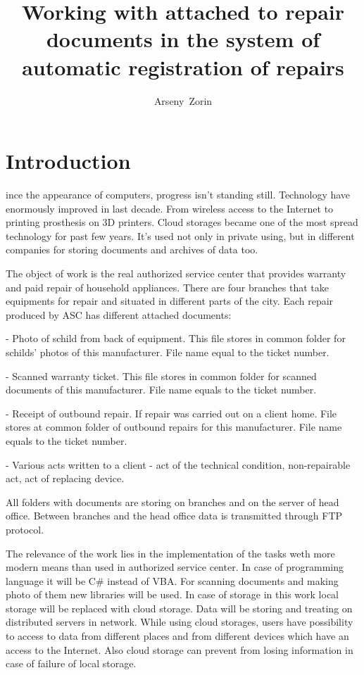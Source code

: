 \documentclass[12pt,journal,compsoc]{D:/Магистратура/English/bare_conf/IEEEtran}
\begin{document}
\title{Working with attached to repair documents in the system of automatic registration of repairs}

\author{Arseny~Zorin}
\maketitle

\IEEEpeerreviewmaketitle



\section{Introduction}
ince the appearance of computers, progress isn't standing still. Technology have enormously improved in last decade. From wireless access to the Internet to printing prosthesis on 3D printers. Cloud storages became one of the most spread technology for past few years. It's used not only in private using, but in different companies for storing documents and archives of data too.

The object of work is the real authorized service center that provides warranty and paid repair of household appliances. There are four branches that take equipments for repair and situated in different parts of the city. Each repair produced by ASC has different attached documents:

  - Photo of schild from back of equipment. This file stores in common folder for schilds' photos of this manufacturer. File name equal to the ticket number.

- Scanned warranty ticket. This file stores in common folder for scanned documents of this manufacturer. File name equals to the ticket number.

- Receipt of outbound repair. If repair was carried out on a client home. File stores at common folder of outbound repairs for this manufacturer. File name equals to the ticket number.

- Various acts written to a client - act of the technical condition, non-repairable act, act of replacing device.

All folders with documents are storing on branches and on the server of head office. Between branches and the head office data is transmitted through FTP protocol.

The relevance of the work lies in the implementation of the tasks weth more modern means than used in authorized service center. In case of programming language it will be C\# instead of VBA. For scanning documents and making photo of them new libraries will be used. In case of storage in this work local storage will be replaced with cloud storage. Data will be storing and treating on distributed servers in network. While using cloud storages, users have possibility to access to data from different places and from different devices which have an access to the Internet. Also cloud storage can prevent from losing information in case of failure of local storage.
\end{document}
